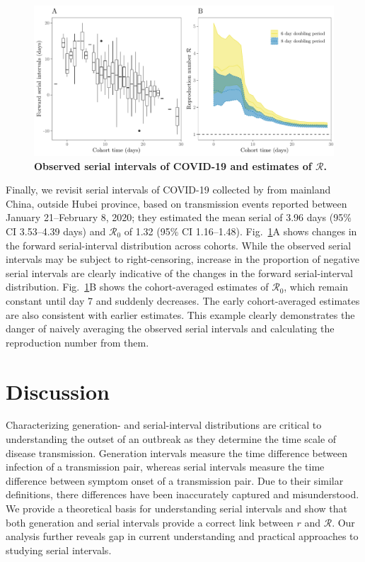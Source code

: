 \documentclass[12pt]{article}
\newcommand{\fref}[1]{Fig.~\ref{fig:#1}}
\begin{document}
\begin{figure}[!th]
\includegraphics[width=\textwidth]{serial_analysis.pdf}
\caption{
\textbf{Observed serial intervals of COVID-19 and estimates of $\mathcal R$.}
}
\label{fig:du}
\end{figure}

Finally, we revisit serial intervals of COVID-19 collected by \cite{du2020serial} from mainland China, outside Hubei province, based on transmission events reported between January 21--February 8, 2020;
they estimated the mean serial of 3.96 days (95\% CI 3.53–4.39 days) and $\mathcal R_0$ of 1.32 (95\% CI 1.16–1.48).
\fref{du}A shows changes in the forward serial-interval distribution across cohorts.
While the observed serial intervals may be subject to right-censoring, increase in the proportion of negative serial intervals are clearly indicative of the changes in the forward serial-interval distribution.
\fref{du}B shows the cohort-averaged estimates of $\mathcal R_0$, which remain constant until day 7 and suddenly decreases.
The early cohort-averaged estimates are also consistent with earlier estimates.
This example clearly demonstrates the danger of naively averaging the observed serial intervals and calculating the reproduction number from them.

\section{Discussion}

Characterizing generation- and serial-interval distributions are critical to understanding the outset of an outbreak as they determine the time scale of disease transmission.
Generation intervals measure the time difference between infection of a transmission pair, whereas serial intervals measure the time difference between symptom onset of a transmission pair.
Due to their similar definitions, there differences have been inaccurately captured and misunderstood.
We provide a theoretical basis for understanding serial intervals and show that both generation and serial intervals provide a correct link between $r$ and $\mathcal R$.
Our analysis further reveals gap in current understanding and practical approaches to studying serial intervals.
\end{document}
